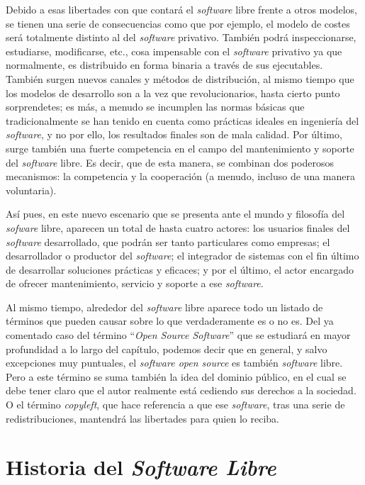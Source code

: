 Debido a esas libertades con que contará el \textit{software} libre frente a
otros modelos, se tienen una serie de consecuencias como que por ejemplo, el
modelo de costes será totalmente distinto al del \textit{software} privativo.
También podrá inspeccionarse, estudiarse, modificarse, etc., cosa impensable
con el \textit{software} privativo ya que normalmente, es distribuido en forma
binaria a través de sus ejecutables. También surgen nuevos canales y métodos de
distribución, al mismo tiempo que los modelos de desarrollo son a la vez que
revolucionarios, hasta cierto punto sorprendetes; es más, a menudo se incumplen
las normas básicas que tradicionalmente se han tenido en cuenta como prácticas
ideales en ingeniería del \textit{software}, y no por ello, los resultados
finales son de mala calidad. Por último, surge también una fuerte competencia
en el campo del mantenimiento y soporte del \textit{software} libre. Es decir,
que de esta manera, se combinan dos poderosos mecanismos: la competencia y la
cooperación (a menudo, incluso de una manera voluntaria).

Así pues, en este nuevo escenario que se presenta ante el mundo y filosofía del
\textit{sofware} libre, aparecen un total de hasta cuatro actores: los usuarios
finales del \textit{software} desarrollado, que podrán ser tanto particulares
como empresas; el desarrollador o productor del \textit{software}; el integrador
de sistemas con el fin último de desarrollar soluciones prácticas y eficaces; y
por el último, el actor encargado de ofrecer mantenimiento, servicio y soporte a
ese \textit{software}.

Al mismo tiempo, alrededor del \textit{software} libre aparece todo un listado
de términos que pueden causar sobre lo que verdaderamente es o no es. Del ya
comentado caso del término ``\textit{Open Source Software}'' que se estudiará en
mayor profundidad a lo largo del capítulo, podemos decir que en general, y salvo
excepciones muy puntuales, el \textit{software open source} es también
\textit{software} libre. Pero a este término se suma también la idea del
dominio público, en el cual se debe tener claro que el autor realmente está
cediendo sus derechos a la sociedad. O el término \textit{copyleft}, que hace
referencia a que ese \textit{software}, tras una serie de redistribuciones,
mantendrá las libertades para quien lo reciba.

\section{Historia del \textit{Software Libre}}

